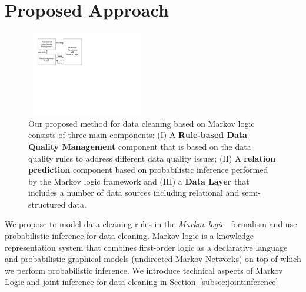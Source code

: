 
\section{Proposed Approach}
\label{sec:method}


 \begin{figure}[t]
 \centering
 \includegraphics[width=200px, height=140px]{img/system.pdf}
 \caption{%
  Our proposed method for data cleaning based on Markov logic consists of three main components: 
 (I) A \textbf{Rule-based Data Quality Management} component that is based on the data quality rules to address different data quality issues;
 (II) A \textbf{relation prediction} component based on probabilistic inference performed by the Markov logic framework and (III) 
 a \textbf{Data Layer} that includes a number of data sources including relational and semi-structured data.}
 \label{fig:system}
\end{figure}     

We propose to model data cleaning rules in the \textit{Markov logic}~\cite{domingos2009markov} formalism and use probabilistic inference for data cleaning. Markov logic is a knowledge representation system that combines first-order logic as a declarative language and probabilistic graphical models (undirected Markov Networks) on top of which we perform probabilistic inference. We introduce technical aspects of Markov Logic and joint inference for data cleaning in Section~\ref{subsec:jointinference}

